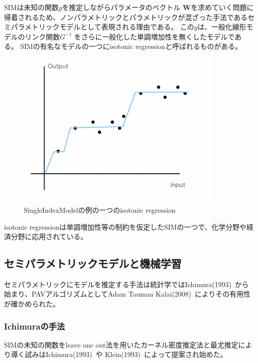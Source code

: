 SIMは未知の関数$ g $を推定しながらパラメータのベクトル $ \mathbf{W} $を求めていく問題に帰着されるため、ノンパラメトリックとパラメトリックが混ざった手法であるセミパラメトリックモデルとして表現される理由である。
この$ g $は、一般化線形モデルのリンク関数$ G^{-1} $ をさらに一般化した単調増加性を無くしたモデルである。
SIMの有名なモデルの一つにisotonic regressionと呼ばれるものがある。

\begin{figure}[hbtp]

    \begin{center}
        \includegraphics[width=10cm]{asset/isotonic_regression.png}
            \caption{SingleIndexModelの例の一つのisotonic regression}
            \label{isotonic_regression}
    \end{center}
\end{figure}

isotonic regressionは単調増加性等の制約を仮定したSIMの一つで、化学分野や経済分野に応用されている。


\subsection {セミパラメトリックモデルと機械学習}

セミパラメトリックにモデルを推定する手法は統計学ではIchimura(1993)~\cite{ichimura}から始まり、PAVアルゴリズムとしてAdam Tauman Kalai(2008)~\cite{isotron}によりその有用性が確かめられた。

\subsubsection{Ichimuraの手法}

SIMの未知の関数をleave one out法を用いたカーネル密度推定法と最尤推定により導く試みはIchimura(1993)~\cite{ichimura}や Klein(1993)~\cite{klein}によって提案され始めた。

